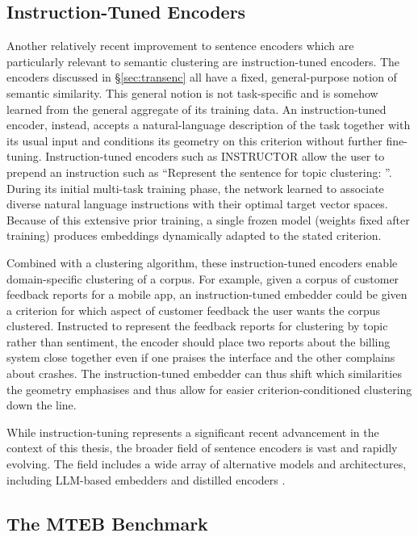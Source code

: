 \documentclass[11pt,a4paper,oneside]{report}
\begin{document}
\subsection{Instruction-Tuned Encoders}

Another relatively recent improvement to sentence encoders which are particularly relevant to semantic clustering are instruction-tuned encoders. The encoders discussed in \S\ref{sec:transenc} all have a fixed, general-purpose notion of semantic similarity. This general notion is not task-specific and is somehow learned from the general aggregate of its training data. An instruction-tuned encoder, instead, accepts a natural-language description of the task together with its usual input and conditions its geometry on this criterion without further fine-tuning. Instruction-tuned encoders such as INSTRUCTOR \citep{su2023instructor} allow the user to prepend an instruction such as ``Represent the sentence for topic clustering: ''. During its initial multi-task training phase, the network learned to associate diverse natural language instructions with their optimal target vector spaces. Because of this extensive prior training, a single frozen model (weights fixed after training) produces embeddings dynamically adapted to the stated criterion.

Combined with a clustering algorithm, these instruction-tuned encoders enable domain-specific clustering of a corpus. For example, given a corpus of customer feedback reports for a mobile app, an instruction-tuned embedder could be given a criterion for which aspect of customer feedback the user wants the corpus clustered. Instructed to represent the feedback reports for clustering by topic rather than sentiment, the encoder should place two reports about the billing system close together even if one praises the interface and the other complains about crashes. The instruction-tuned embedder can thus shift which similarities the geometry emphasises and thus allow for easier criterion-conditioned clustering down the line.

While instruction-tuning represents a significant recent advancement in the context of this thesis, the broader field of sentence encoders is vast and rapidly evolving. The field includes a wide array of alternative models and architectures, including LLM-based embedders \citep{behnamghader2024llm2vec,muennighoff2025gritlm,lee2025nvembed} and distilled encoders \citep{zhang2024stella}.

\subsection{The MTEB Benchmark}\label{sec:mteb}
\end{document}
